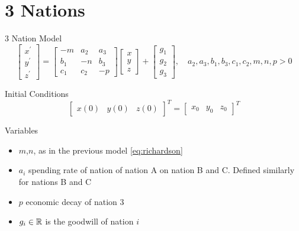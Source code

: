 \documentclass{beamer}
\begin{document}
\section{3 Nations}
\begin{frame}
  \begin{block}{3 Nation Model}
    \begin{equation}\label{eq:nation}
    \begin{bmatrix}
      x^\prime \\ y^\prime \\ z^\prime
    \end{bmatrix}
    = \begin{bmatrix}
      -m & a_{2} & a_{3} \\
      b_1 & -n & b_3 \\
      c_1 & c_2 & -p
      \end{bmatrix}
      \begin{bmatrix}
	x \\ y \\ z
	\end{bmatrix}+\begin{bmatrix}g_{1}\\g_{2}\\g_{3}\end{bmatrix},\quad a_2,a_3,b_1,b_3,c_1,c_2,m,n,p>0
  \end{equation}
\end{block}
\begin{block}{Initial Conditions}
  \[ \begin{bmatrix}x(0)&y(0)&z(0)\end{bmatrix}^T=\begin{bmatrix}x_0 & y_0 & z_0\end{bmatrix}^T
\]
\end{block}
  \begin{block}{Variables}
    \begin{itemize}
      \item $m$,$n$, as in the previous model \autoref{eq:richardson}
      \item $a_i$ spending rate of nation of nation A on nation B and C. Defined similarly for nations B and C
      \item $p$ economic decay of nation 3
      \item $g_i\in\mathbb{R}$ is the goodwill of nation $i$
    \end{itemize}
  \end{block}
\end{frame}
\end{document}
